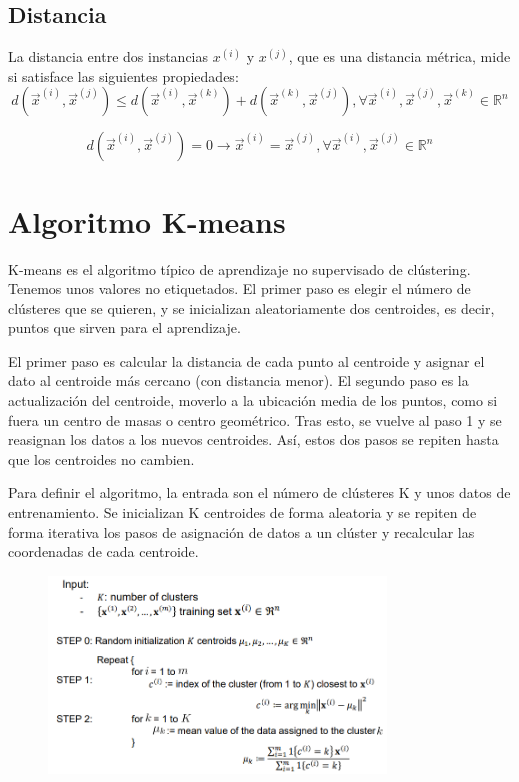 \subsection{Distancia}
La distancia entre dos instancias $x^{(i)}$ y $x^{(j)}$, que es una distancia métrica, mide si satisface las siguientes propiedades:
$$d(\vec{x}^{(i)}, \vec{x}^{(j)}) \leq d(\vec{x}^{(i)}, \vec{x}^{(k)}) + d(\vec{x}^{(k)}, \vec{x}^{(j)}), \forall  \vec{x}^{(i)}, \vec{x}^{(j)}, \vec{x}^{(k)} \in \mathbb{R}^n$$

$$d(\vec{x}^{(i)}, \vec{x}^{(j)}) = 0 \rightarrow \vec{x}^{(i)} = \vec{x}^{(j)}, \forall \vec{x}^{(i)}, \vec{x}^{(j)} \in \mathbb{R}^n$$

\section{Algoritmo K-means}
K-means es el algoritmo típico de aprendizaje no supervisado de clústering. Tenemos unos valores no etiquetados. El primer paso es elegir el número de clústeres que se quieren, y se inicializan aleatoriamente dos centroides, es decir, puntos que sirven para el aprendizaje. 

El primer paso es calcular la distancia de cada punto al centroide y asignar el dato al centroide más cercano (con distancia menor). El segundo paso es la actualización del centroide, moverlo a la ubicación media de los puntos, como si fuera un centro de masas o centro geométrico. Tras esto, se vuelve al paso 1 y se reasignan los datos a los nuevos centroides. Así, estos dos pasos se repiten hasta que los centroides no cambien.

Para definir el algoritmo, la entrada son el número de clústeres K y unos datos de entrenamiento. Se inicializan K centroides de forma aleatoria y se repiten de forma iterativa los pasos de asignación de datos a un clúster y recalcular las coordenadas de cada centroide. 

\begin{figure}[h]
\centering
\includegraphics[width = 0.8\textwidth]{figs/kmeans-algorithm.png}
\end{figure}

